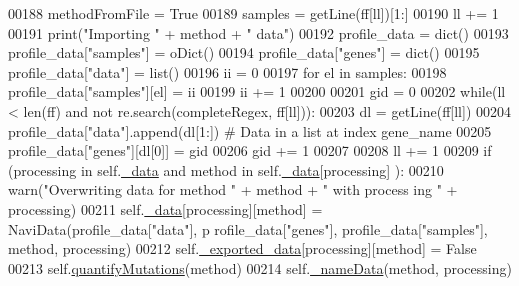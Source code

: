 \begin{DoxyCode}
00188                         methodFromFile = \textcolor{keyword}{True}
00189                     samples = getLine(ff[ll])[1:]
00190                     ll += 1
00191                 \textcolor{keywordflow}{print}(\textcolor{stringliteral}{"Importing "} + method + \textcolor{stringliteral}{" data"})
00192                 profile\_data = dict()
00193                 profile\_data[\textcolor{stringliteral}{"samples"}] = oDict()
00194                 profile\_data[\textcolor{stringliteral}{"genes"}] = dict()
00195                 profile\_data[\textcolor{stringliteral}{"data"}] = list()
00196                 ii = 0
00197                 \textcolor{keywordflow}{for} el \textcolor{keywordflow}{in} samples:
00198                     profile\_data[\textcolor{stringliteral}{"samples"}][el] = ii
00199                     ii += 1
00200 
00201                 gid = 0
00202                 \textcolor{keywordflow}{while}(ll < len(ff) \textcolor{keywordflow}{and} \textcolor{keywordflow}{not} re.search(completeRegex, ff[ll])):
00203                     dl = getLine(ff[ll])
00204                     profile\_data[\textcolor{stringliteral}{"data"}].append(dl[1:]) \textcolor{comment}{# Data in a list at index
       gene\_name}
00205                     profile\_data[\textcolor{stringliteral}{"genes"}][dl[0]] = gid
00206                     gid += 1
00207 
00208                     ll += 1
00209                 \textcolor{keywordflow}{if} (processing \textcolor{keywordflow}{in} self.\hyperlink{classnavicom_1_1navicom_1_1NaviCom_a407b2b5c30a5652ee85c4be54b3e6679}{_data} \textcolor{keywordflow}{and} method \textcolor{keywordflow}{in} self.\hyperlink{classnavicom_1_1navicom_1_1NaviCom_a407b2b5c30a5652ee85c4be54b3e6679}{_data}[processing]
      ):
00210                     warn(\textcolor{stringliteral}{"Overwriting data for method "} + method + \textcolor{stringliteral}{" with process
      ing "} + processing)
00211                 self.\hyperlink{classnavicom_1_1navicom_1_1NaviCom_a407b2b5c30a5652ee85c4be54b3e6679}{_data}[processing][method] = NaviData(profile\_data[\textcolor{stringliteral}{"data"}], p
      rofile\_data[\textcolor{stringliteral}{"genes"}], profile\_data[\textcolor{stringliteral}{"samples"}], method, processing)
00212                 self.\hyperlink{classnavicom_1_1navicom_1_1NaviCom_ab7328fbbe89a1b3cb2db8c3d456d958f}{_exported_data}[processing][method] = \textcolor{keyword}{False}
00213                 self.\hyperlink{classnavicom_1_1navicom_1_1NaviCom_a5314c49d6b9749693519a4a86cbfde71}{quantifyMutations}(method)
00214                 self.\hyperlink{classnavicom_1_1navicom_1_1NaviCom_a140128d0fd12930347cc2375c154072d}{_nameData}(method, processing)

\end{DoxyCode}
